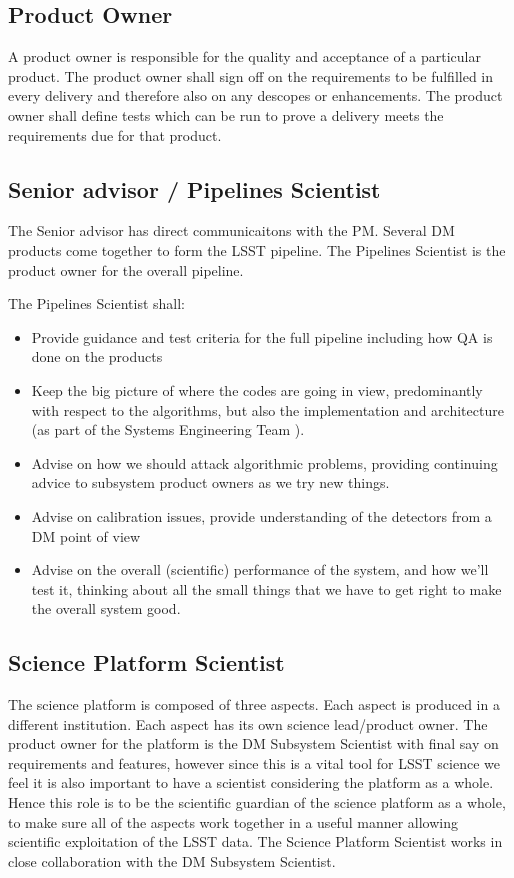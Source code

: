 \subsection{Product Owner \label{role:prodo}}

A product owner is responsible for the quality and acceptance of a particular product.
The product owner shall sign off on the requirements to be fulfilled in every delivery and therefore also on any descopes or enhancements.
The product owner shall define tests which can be run to prove a delivery meets the requirements due for that product.

\subsection{Senior advisor / Pipelines Scientist \label{role:pipe}}

The Senior advisor has direct communicaitons with the PM. Several DM products come together to form the LSST pipeline. The Pipelines Scientist is the product owner for the overall pipeline.

The Pipelines Scientist shall:

\begin{itemize}

\item Provide guidance and test criteria for the full pipeline including how QA is done on the products
\item Keep the big picture of where the codes are going in view, predominantly with respect to the algorithms, but also the implementation and architecture (as part of the Systems Engineering Team ).
\item Advise on how we should attack algorithmic problems, providing continuing advice to subsystem product owners as we try new things.
\item Advise on calibration issues, provide understanding of the detectors from a DM point of view
\item Advise on the overall (scientific) performance of the system, and how we'll test it, thinking about all the small things that we have to get right to make the overall system good.

\end{itemize}

\subsection{Science Platform Scientist \label{role:scip}}
The science platform is composed of three aspects. Each aspect is produced in a different institution.
Each aspect has its own science lead/product owner.
The product owner for the platform is the DM Subsystem Scientist  with final say on requirements and features, however since this is a vital tool for LSST science we feel it is also important to have a scientist considering the platform as a whole.
Hence this role is to be the scientific guardian of the science platform as a whole, to make sure all of the aspects work together in a useful manner allowing scientific exploitation of the LSST data. The Science Platform Scientist works in close collaboration with the DM Subsystem Scientist.

